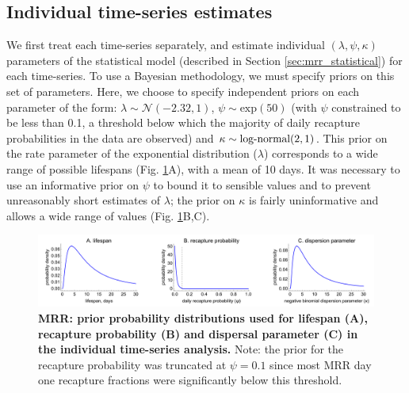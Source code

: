 \documentclass[12pt]{article}
\begin{document}
\subsection{Individual time-series estimates}\label{sec:MRR_individual_analysis}
We first treat each time-series separately, and estimate individual $(\lambda,\psi,\kappa)$ parameters of the statistical model (described in Section \ref{sec:mrr_statistical}) for each time-series. To use a Bayesian methodology, we must specify priors on this set of parameters. Here, we choose to specify independent priors on each parameter of the form: $\lambda\sim \mathcal{N}(-2.32,1)$, $\psi\sim \text{exp}(50)$ (with $\psi$ constrained to be less than 0.1, a threshold below which the majority of daily recapture probabilities in the data are observed) and $\kappa\sim \textnormal{log-normal}(2,1)$. This prior on the rate parameter of the exponential distribution ($\lambda$) corresponds to a wide range of possible lifespans (Fig. \ref{fig:mrr_individualTimeSeries_priors}A), with a mean of 10 days. It was necessary to use an informative prior on $\psi$ to bound it to sensible values and to prevent unreasonably short estimates of $\lambda$; the prior on $\kappa$ is fairly uninformative and allows a wide range of values (Fig. \ref{fig:mrr_individualTimeSeries_priors}B,C). 


\begin{figure}[h]
	\centerline{\includegraphics[width=1.25\textwidth]{./Figure_files/mrr_individualTimeSeries_priors.pdf}}
	\caption{\textbf{MRR: prior probability distributions used for lifespan (A), recapture probability (B) and dispersal parameter (C) in the individual time-series analysis.} Note: the prior for the recapture probability was truncated at $\psi=0.1$ since most MRR day one recapture fractions were significantly below this threshold.}
	\label{fig:mrr_individualTimeSeries_priors}
\end{figure}
\end{document}
